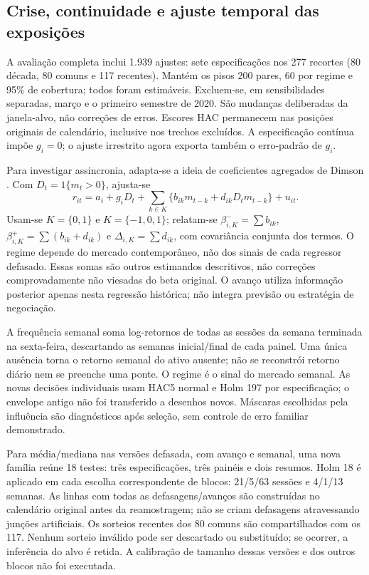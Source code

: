\subsection{Crise, continuidade e ajuste temporal das exposições}
\label{sec:novas-sensibilidades}
A avaliação completa inclui 1.939 ajustes: sete especificações nos 277
recortes (80 década, 80 comuns e 117 recentes). Mantém os pisos 200 pares,
60 por regime e 95\% de cobertura; todos foram estimáveis.
Excluem-se, em sensibilidades separadas, março e o primeiro semestre
de 2020. São mudanças deliberadas da janela-alvo, não correções de erros.
Escores HAC permanecem nas posições originais de calendário, inclusive
nos trechos excluídos. A especificação contínua impõe $g_i=0$;
o ajuste irrestrito agora exporta também o erro-padrão de $g_i $.

Para investigar assincronia, adapta-se a ideia de coeficientes agregados
de Dimson \cite{dimson1979}. Com $D_t=1\{m_t>0\}$, ajusta-se
\begin{equation}
r_{it}=a_i+g_iD_t+\sum_{k\in K}
 \{b_{ik}m_{t-k}+d_{ik}D_tm_{t-k}\}+u_{it}.
\end{equation}
Usam-se $K=\{0,1\}$ e $K=\{-1,0,1\}$; relatam-se
$\beta^-_{i,K}=\sum b_{ik}$, $\beta^+_{i,K}=\sum(b_{ik}+d_{ik})$
e $\Delta_{i,K}=\sum d_{ik}$, com covariância conjunta dos termos.
O regime depende do mercado contemporâneo, não dos sinais de cada
regressor defasado. Essas somas são outros estimandos descritivos,
não correções comprovadamente não viesadas do beta original.
O avanço utiliza informação posterior apenas nesta regressão histórica;
não integra previsão ou estratégia de negociação.

A frequência semanal soma log-retornos de todas as sessões da semana
terminada na sexta-feira, descartando as semanas inicial/final de cada
painel. Uma única ausência torna o retorno semanal do ativo ausente;
não se reconstrói retorno diário nem se preenche uma ponte.
O regime é o sinal do mercado semanal. As novas decisões individuais
usam HAC5 normal e Holm 197 por especificação; o envelope antigo não
foi transferido a desenhos novos. Máscaras escolhidas pela influência
são diagnósticos após seleção, sem controle de erro familiar demonstrado.

Para média/mediana nas versões defasada, com avanço e semanal,
uma nova família reúne 18 testes: três especificações, três painéis
e dois resumos. Holm 18 é aplicado em cada escolha correspondente
de blocos: 21/5/63 sessões e 4/1/13 semanas. As linhas com todas as
defasagens/avanços são construídas no calendário original antes da
reamostragem; não se criam defasagens atravessando junções artificiais.
Os sorteios recentes dos 80 comuns são compartilhados com os 117.
Nenhum sorteio inválido pode ser descartado ou substituído; se ocorrer,
a inferência do alvo é retida. A calibração de tamanho dessas versões
e dos outros blocos não foi executada.

